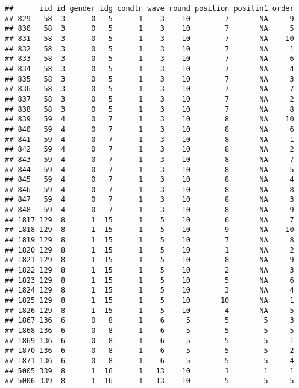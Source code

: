 \documentclass[]{article}
\begin{document}
\begin{verbatim}
##      iid id gender idg condtn wave round position positin1 order
## 829   58  3      0   5      1    3    10        7       NA     9
## 830   58  3      0   5      1    3    10        7       NA     5
## 831   58  3      0   5      1    3    10        7       NA    10
## 832   58  3      0   5      1    3    10        7       NA     1
## 833   58  3      0   5      1    3    10        7       NA     6
## 834   58  3      0   5      1    3    10        7       NA     4
## 835   58  3      0   5      1    3    10        7       NA     3
## 836   58  3      0   5      1    3    10        7       NA     7
## 837   58  3      0   5      1    3    10        7       NA     2
## 838   58  3      0   5      1    3    10        7       NA     8
## 839   59  4      0   7      1    3    10        8       NA    10
## 840   59  4      0   7      1    3    10        8       NA     6
## 841   59  4      0   7      1    3    10        8       NA     1
## 842   59  4      0   7      1    3    10        8       NA     2
## 843   59  4      0   7      1    3    10        8       NA     7
## 844   59  4      0   7      1    3    10        8       NA     5
## 845   59  4      0   7      1    3    10        8       NA     4
## 846   59  4      0   7      1    3    10        8       NA     8
## 847   59  4      0   7      1    3    10        8       NA     3
## 848   59  4      0   7      1    3    10        8       NA     9
## 1817 129  8      1  15      1    5    10        6       NA     7
## 1818 129  8      1  15      1    5    10        9       NA    10
## 1819 129  8      1  15      1    5    10        7       NA     8
## 1820 129  8      1  15      1    5    10        1       NA     2
## 1821 129  8      1  15      1    5    10        8       NA     9
## 1822 129  8      1  15      1    5    10        2       NA     3
## 1823 129  8      1  15      1    5    10        5       NA     6
## 1824 129  8      1  15      1    5    10        3       NA     4
## 1825 129  8      1  15      1    5    10       10       NA     1
## 1826 129  8      1  15      1    5    10        4       NA     5
## 1867 136  6      0   8      1    6     5        5        5     3
## 1868 136  6      0   8      1    6     5        5        5     5
## 1869 136  6      0   8      1    6     5        5        5     1
## 1870 136  6      0   8      1    6     5        5        5     2
## 1871 136  6      0   8      1    6     5        5        5     4
## 5005 339  8      1  16      1   13    10        1        1     1
## 5006 339  8      1  16      1   13    10        5        5     5

\end{verbatim}
\end{document}
